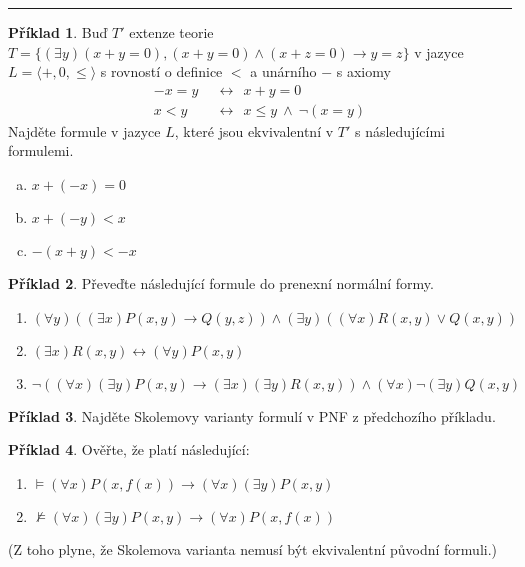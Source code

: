 \documentclass{amsart}
\theoremstyle{definition}
\newtheorem{problem}{Příklad}
\theoremstyle{remark}
\begin{document}
\medskip
\hrule

\begin{problem}
Buď $T'$ extenze teorie $T=\{(\exists y)(x+y=0),(x+y=0)\wedge (x+z=0)\rightarrow y=z\}$ v jazyce $L=\langle +,0,\le\rangle$ s rovností o definice $<$ a unárního $-$ s axiomy
\begin{align*}
-x=y\ \ &\leftrightarrow\ \ x+y=0\\
x<y\ \ &\leftrightarrow\ \ x\le y\ \wedge\ \neg(x=y)
\end{align*}
Najděte formule v jazyce $L$, které jsou ekvivalentní v $T'$ s následujícími formulemi.
\begin{enumerate}[(a)]
\itemsep6pt
\item $x+(-x)=0$
\item $x+(-y)<x$
\item $-(x+y)<-x$
\end{enumerate}
\end{problem}

\medskip


\begin{problem} Převeďte následující formule do prenexní normální formy.
\begin{enumerate}
\itemsep6pt
\item $(\forall y)((\exists x)P(x,y)\to Q(y,z))\wedge (\exists y)((\forall x)R(x,y)\vee Q(x,y))$
\item $(\exists x)R(x,y)\leftrightarrow (\forall y)P(x,y)$
\item $\neg((\forall x)(\exists y)P(x,y)\to (\exists x)(\exists y)R(x,y))\wedge(\forall x)\neg(\exists y)Q(x,y)$
\end{enumerate}
\end{problem}

\medskip

\begin{problem} Najděte Skolemovy varianty formulí v PNF z předchozího příkladu.
\end{problem}

\medskip

\begin{problem} Ověřte, že platí následující:
\begin{enumerate}
\itemsep6pt
\item $\models (\forall x)P(x,f(x)) \to (\forall x)(\exists y)P(x,y)$
\item $\not\models (\forall x)(\exists y)P(x,y)\to (\forall x)P(x,f(x))$
\end{enumerate}
(Z toho plyne, že Skolemova varianta nemusí být ekvivalentní původní formuli.)
\end{problem}
\end{document}
